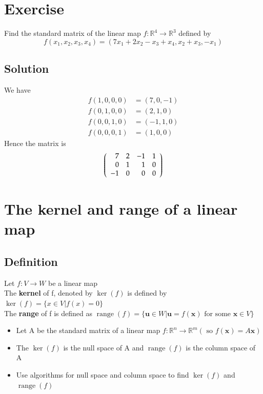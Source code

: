 \documentclass{article}[18pt]
\begin{document}
\section{Exercise}
Find the standard matrix of the linear map $f:\mathbb{R}^4\rightarrow \mathbb{R}^3$ defined by
$$f \left( x _ { 1 } , x _ { 2 } , x _ { 3 } , x _ { 4 } \right) = \left( 7 x _ { 1 } + 2 x _ { 2 } - x _ { 3 } + x _ { 4 } , x _ { 2 } + x _ { 3 } , - x _ { 1 } \right)$$
\subsection{Solution}
We have
$$\begin{aligned} f ( 1,0,0,0 ) & = ( 7,0 , - 1 ) \\ f ( 0,1,0,0 ) & = ( 2,1,0 ) \\ f ( 0,0,1,0 ) & = ( - 1,1,0 ) \\ f ( 0,0,0,1 ) & = ( 1,0,0 ) \end{aligned}$$
Hence the matrix is
$$\left( \begin{array} { r r r r } { 7 } & { 2 } & { - 1 } & { 1 } \\ { 0 } & { 1 } & { 1 } & { 0 } \\ { - 1 } & { 0 } & { 0 } & { 0 } \end{array} \right)$$
\section{The kernel and range of a linear map}
\subsection{Definition}
Let $f: V\rightarrow W$ be a linear map\\
The \textbf{kernel} of f, denoted by $\operatorname{ker}(f)$ is defined by $\operatorname{ker}(f)=\{x\in V| f(x)=0\}$\\
The \textbf{range} of f  is defined as $\operatorname{range}( f ) = \{ \mathbf { u } \in W | \mathbf { u } = f ( \mathbf { x } ) \text { for some } \mathbf { x } \in V \}$
\begin{itemize}
	\item Let A be the standard matrix of a linear map $f : \mathbb { R } ^ { n } \rightarrow \mathbb { R } ^ { m } ( \text { so } f ( \mathbf { x } ) = A \mathbf { x } )$
	\item The $\operatorname{ker}(f)$ is the null space of A and $\operatorname{range}(f)$ is the column space of A
	\item Use algorithms for null space and column space to find $\operatorname{ker}(f)$ and $\operatorname{range}(f)$
\end{itemize}
\end{document}
